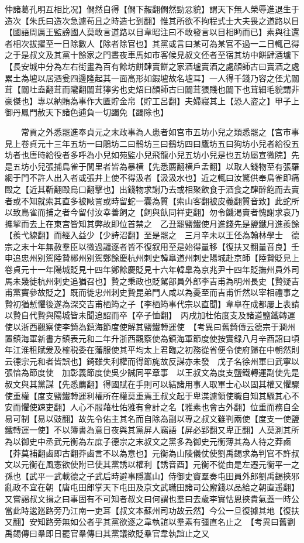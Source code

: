 仲諸葛孔明互相比况】僴然自得【僴下赧翻僴然勁忿貌】謂天下無人榮辱進退生于造次【朱氏曰造次急遽苟且之時造七到翻】惟其所欲不拘程式士大夫畏之道路以目【國語周厲王監謗國人莫敢言道路以目韋昭注曰不敢發言以目相眄而已】素與往還者相次拔擢至一日除數人【除者除官也】其黨或言曰某可為某官不過一二日輒己得之于是叔文及其黨十餘家之門晝夜車馬如市客候見叔文伾者至宿其坊中餅肆酒壚下【長安城中分為左右街畫為百有餘坊餅肆賣餅之家酒壚賣酒之處顔師古曰賣酒之處累土為壚以居酒瓮四邊隆起其一面高形如鍜壚故名壚耳】一人得千錢乃容之伾尤闒茸【闒吐盍翻茸而隴翻闒茸獰劣也史炤曰顔師古曰闒茸猥賤也闒下也茸細毛貌謂非豪傑也】專以納賄為事作大匱貯金帛【貯工呂翻】夫婦寢其上【恐人盗之】甲子上御丹鳳門赦天下諸色逋負一切蠲免【蠲除也】

　　常貢之外悉罷進奉貞元之末政事為人患者如宫市五坊小兒之類悉罷之【宫市事見上卷貞元十三年五坊一曰鵰坊二曰鶻坊三曰鷂坊四曰鷹坊五曰狗坊小兒者給役五坊者也唐時給役者多呼為小兒如苑監小兒飛龍小兒五坊小兒是也五坊屬宣微院】先是五坊小兒張捕鳥雀于閭里者皆為暴横【先悉薦翻横戶孟翻】以取人錢物至有張羅網于門不許人出入者或張井上使不得汲者【汲汲水也】近之輒曰汝驚供奉鳥雀即痛毆之【近其靳翻毆烏口翻擊也】出錢物求謝乃去或相聚飲食于酒食之肆醉飽而去賣者或不知就索其直多被敺詈或時留蛇一囊為質【索山客翻被皮義翻質音致】此蛇所以致鳥雀而捕之者今留付汝幸善飼之【飼與飤同祥吏翻】勿令饑渇賣者愧謝求哀乃攜挈而去上在東宫皆知其弊故即位首禁之　乙丑罷鹽鐵使月進錢先是鹽鐵月進羨餘【羨弋線翻】而經入益少【少詩沼翻】至是罷之　三月辛未以王伾為翰林學士　德宗之末十年無赦羣臣以微過譴逐者皆不復叙用至是始得量移【復扶又翻量音良】壬申追忠州别駕陸贄郴州别駕鄭餘慶杭州刺史韓臯道州刺史陽城赴京師【陸贄貶見上卷貞元十一年陽城貶見十四年鄭餘慶貶見十六年韓臯為京兆尹十四年貶撫州員外司馬未幾徙杭州刺史追猶召也】贄之秉政也貶駕部員外郎李吉甫為明州長史【贄疑吉甫黨竇參故貶之】既而徙忠州刺史贄昆弟門人咸以為憂至而吉甫忻然以宰相禮事之贄初猶慙懼後遂為深交吉甫栖筠之子【李栖筠事代宗以直聞】韋臯在成都屢上表請以贄自代贄與陽城皆未聞追詔而卒【卒子恤翻】　丙戌加杜佑度支及諸道鹽鐵轉運使以浙西觀察使李錡為鎮海節度使解其鹽鐵轉運使　【考異曰舊錡傳云德宗于潤州置鎮海軍新書方鎮表元和二年升浙西觀察使為鎮海軍節度使按實録八月辛酉詔曰頃年江淮租賦爰及榷税委在藩服使其平均太上君臨之初務從省便令使府歸在中朝然則云德宗元和者皆誤也】錡雖失利權而得節旄故反謀亦未發　戊子名徐州軍曰武寧以張愔為節度使　加彰義節度使吳少誠同平章事　以王叔文為度支鹽鐵轉運副使先是叔文與其黨謀【先悉薦翻】得國賦在手則可以結諸用事人取軍士心以固其權又懼驟使重權【度支鹽鐵轉運利權所在權莫重焉王叔文起于卑渫遽領使職自知其驟其心不安而懼使踈吏翻】人心不服藉杜佑雅有會計之名【雅素也會古外翻】位重而務自全易可制【易以豉翻】故先令佑主其名而自除為副以專之叔文雖判兩使【度支一使鹽鐵轉運一使】不以簿書為意日夜與其黨屏人竊語【屏必郢翻又卑正翻】人莫測其所為以御史中丞武元衡為左庶子德宗之末叔文之黨多為御史元衡薄其為人待之莽鹵【莽莫補翻鹵即古翻莽鹵言不以為意也】元衡為山陵儀仗使劉禹錫求為判官不許叔文以元衡在風憲欲使附已使其黨誘以權利【誘音酉】元衡不從由是左遷元衡平一之孫也【武平一武載德之子武后時避事隱嵩山】侍御史竇羣奏屯田員外郎劉禹錫挾邪亂政不宜在朝【唐屯田郎掌天下屯田及京文武職田諸司公廨錢以品給之朝直遥翻】又嘗謁叔文揖之曰事固有不可知者叔文曰何謂也羣曰去歲李實怙恩挾貴氣蓋一時公當此時逡廵路旁乃江南一吏耳【叔文本蘇州司功故云然】今公一旦復據其地【復扶又翻】安知路旁無如公者乎其黨欲逐之韋執誼以羣素有彊直名止之　【考異曰舊劉禹錫傳曰羣即日罷官羣傳曰其黨議欲貶羣官韋執誼止之又